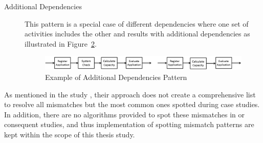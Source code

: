 \begin{description}
\begin{figure}
      \label{fig:different-dependency}
      \end{figure}
  \item[Additional Dependencies] This pattern is a special case of different dependencies where one set of activities includes the other and results with additional dependencies as illustrated in Figure~\ref{fig:additional-dependency}.
      \begin{figure}
      \centering
      \includegraphics[width=\textwidth]{3_background/mismatch-patterns-additional-dependency}
      \caption{Example of Additional Dependencies Pattern}
      \label{fig:additional-dependency}
      \end{figure}
\end{description}

As mentioned in the study \cite{dijkman2007mismatch}, their approach does not create a comprehensive list to resolve all mismatches but the most common ones spotted during case studies. In addition, there are no algorithms provided to spot these mismatches in \cite{dijkman2007mismatch} or consequent studies, and thus implementation of spotting mismatch patterns are kept within the scope of this thesis study. 